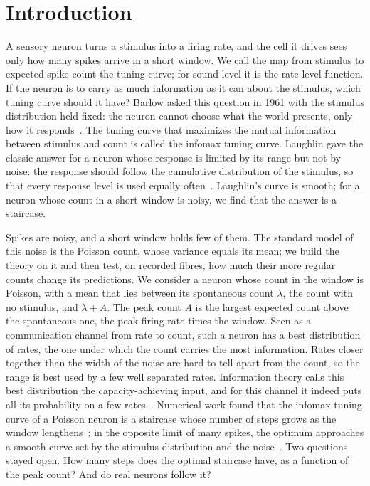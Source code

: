 
\section{Introduction}\label{sec:intro}

A sensory neuron turns a stimulus into a firing rate, and the cell it drives sees only how many spikes arrive in a short window. We call
the map from stimulus to expected spike count the tuning curve; for sound level it is the rate-level function. If the neuron is to
carry as much information as it can about the stimulus, which tuning curve should it have? Barlow asked this question in 1961 with the
stimulus distribution held fixed: the neuron cannot choose what the world presents, only how it responds~\cite{Barlow1961}. The tuning
curve that maximizes the mutual information between stimulus and count is called the infomax tuning curve. Laughlin gave the classic
answer for a neuron whose response is limited by its range but not by noise: the response should follow the cumulative distribution of
the stimulus, so that every response level is used equally often~\cite{Laughlin1981}. Laughlin's curve is smooth; for a neuron
whose count in a short window is noisy, we find that the answer is a staircase.

Spikes are noisy, and a short window holds few of them. The standard model of this noise is the Poisson count, whose variance
equals its mean; we build the theory on it and then test, on recorded fibres, how much their more regular counts change its
predictions. We consider a neuron whose count in the window is Poisson, with a mean that
lies between its spontaneous count $\lambda$, the count with no stimulus, and $\lambda+A$. The peak count $A$ is the largest
expected count above the spontaneous one, the peak firing rate times the window. Seen as a communication channel from rate to count,
such a neuron has a best distribution of rates, the one under which the count carries the most information. Rates closer together
than the width of the noise are hard to tell apart from the count, so the range is best used by a few well separated rates.
Information theory calls this best distribution the capacity-achieving input, and for this channel it indeed puts all its probability
on a few rates~\cite{Shamai1990}. Numerical work found that the infomax tuning curve of a
Poisson neuron is a staircase whose number of steps grows as the window lengthens~\cite{Nikitin2009}; in the opposite limit of many
spikes, the optimum approaches a smooth curve set by the stimulus distribution and the noise~\cite{McDonnellStocks2008}. Two questions
stayed open. How many steps does the optimal staircase have, as a function of the peak count? And do real neurons follow it?

